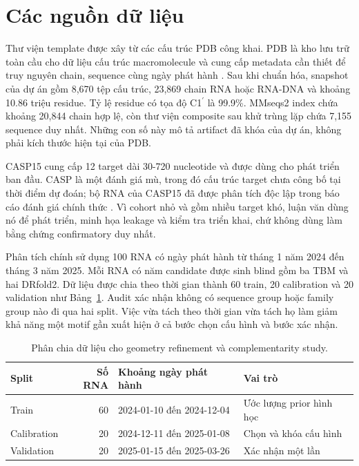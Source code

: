 \documentclass[12pt,a4paper,oneside]{report}
\newcommand{\cprime}{C1$^{\prime}$}
\begin{document}
\section{Các nguồn dữ liệu}

Thư viện template được xây từ các cấu trúc PDB công khai. PDB là kho lưu trữ toàn cầu
cho dữ liệu cấu trúc macromolecule và cung cấp metadata cần thiết để truy nguyên chain,
sequence cùng ngày phát hành \cite{pdb_archive}. Sau khi chuẩn hóa, snapshot của dự án
gồm 8,670 tệp cấu trúc, 23,869 chain RNA hoặc RNA-DNA và khoảng 10.86 triệu residue.
Tỷ lệ residue có tọa độ \cprime{} là 99.9\%. MMseqs2 index chứa khoảng 20,844 chain hợp
lệ, còn thư viện composite sau khử trùng lặp chứa 7,155 sequence duy nhất. Những con số
này mô tả artifact đã khóa của dự án, không phải kích thước hiện tại của PDB.

CASP15 cung cấp 12 target dài 30-720 nucleotide và được dùng cho phát triển ban đầu.
CASP là một đánh giá mù, trong đó cấu trúc target chưa công bố tại thời điểm dự đoán;
bộ RNA của CASP15 đã được phân tích độc lập trong báo cáo đánh giá chính thức
\cite{casp15}. Vì cohort nhỏ và gồm nhiều target khó, luận văn dùng nó để phát triển,
minh họa leakage và kiểm tra triển khai, chứ không dùng làm bằng chứng confirmatory duy
nhất.

Phân tích chính sử dụng 100 RNA có ngày phát hành từ tháng 1 năm 2024 đến tháng 3 năm
2025. Mỗi RNA có năm candidate được sinh blind gồm ba TBM và hai DRfold2. Dữ liệu được
chia theo thời gian thành 60 train, 20 calibration và 20 validation như
Bảng~\ref{tab:splits_vi}. Audit xác nhận không có sequence group hoặc family group nào
đi qua hai split. Việc vừa tách theo thời gian vừa tách họ làm giảm khả năng một motif
gần xuất hiện ở cả bước chọn cấu hình và bước xác nhận.

\begin{table}[H]
\centering
\caption{Phân chia dữ liệu cho geometry refinement và complementarity study.}
\label{tab:splits_vi}
\begin{tabularx}{\textwidth}{l r p{4.2cm} X}
\toprule
Split & Số RNA & Khoảng ngày phát hành & Vai trò \\
\midrule
Train & 60 & 2024-01-10 đến 2024-12-04 & Ước lượng prior hình học \\
Calibration & 20 & 2024-12-11 đến 2025-01-08 & Chọn và khóa cấu hình \\
Validation & 20 & 2025-01-15 đến 2025-03-26 & Xác nhận một lần \\
\bottomrule
\end{tabularx}
\end{table}
\end{document}
